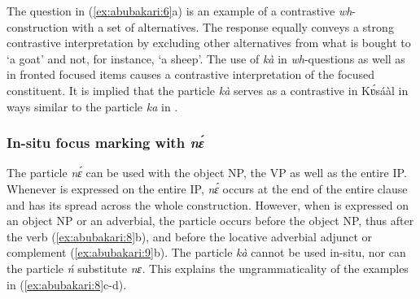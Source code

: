 \documentclass[output=paper
,newtxmath
,modfonts
,nonflat]{langsci/langscibook}
\begin{document}
The question in (\ref{ex:abubakari:6}a) is an example of a contrastive \textit{wh}{}- construction with a set of alternatives. The response equally conveys a strong contrastive  interpretation by excluding other alternatives from what is bought to ‘a goat’ and not, for instance, ‘a sheep’. The use of \textit{kà} in \textit{wh}{}-questions as well as in fronted focused items causes a contrastive  interpretation of the focused constituent. It is implied that the particle \textit{kà} serves as a contrastive  in Kʋ́sáàl in ways similar to the particle \textit{ka} in  \citep{hudu2012}. 

\subsubsection{In-situ focus marking with \textit{nɛ́}}

The particle \textit{nɛ́} can be used with the object NP, the VP as well as the entire IP. Whenever  is expressed on the entire IP, \textit{nɛ́} occurs at the end of the entire clause and has its  spread across the whole construction. However, when  is expressed on an object NP or an adverbial, the particle occurs before the object NP, thus after the verb (\ref{ex:abubakari:8}b), and before the locative adverbial adjunct or complement (\ref{ex:abubakari:9}b).  The particle \textit{kà} cannot be used in-situ, nor can the particle \textit{ń} substitute \textit{nɛ.} This explains the ungrammaticality of the examples in (\ref{ex:abubakari:8}c-d).
\end{document}
